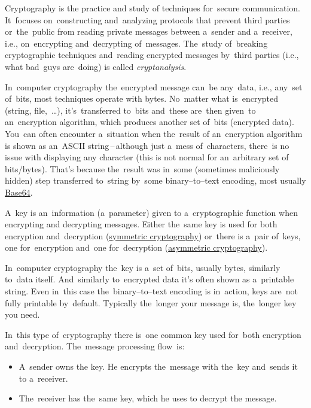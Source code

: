 Cryptography is the practice and study of techniques for~secure communication.
It~focuses on~constructing and~analyzing protocols that prevent third parties or~the~public from reading private messages between a~sender and a~receiver, i.e., on~encrypting and~decrypting of~messages.
The~study of~breaking cryptographic techniques and~reading encrypted messages by~third parties (i.e., what bad~guys are~doing) is called \textit{cryptanalysis}.

In~computer cryptography the~encrypted message can~be any~data, i.e., any~set of~bits, most techniques operate with bytes.
No~matter what is~encrypted (string, file,~\dots), it's~transferred to~bits and~these are~then given~to an~encryption algorithm, which produces another set of~bits (encrypted data).
You~can often encounter a~situation when the~result of an~encryption algorithm is shown as an~ASCII string\,--\,although just a~mess of~characters, there~is no issue with displaying any character (this is not normal for an~arbitrary set of bits/bytes).
That's because the~result was in~some (sometimes maliciously hidden) step transferred to~string by~some binary--to--text encoding, most usually \hyperref[base64]{Base64}.

A~key is an~information (a~parameter) given to a~cryptographic function when encrypting and decrypting messages.
Either the~same key is used for both encryption and~decryption (\hyperref[symmetriccryptography]{symmetric cryptography}) or~there is a~pair of~keys, one for~encryption and~one for~decryption (\hyperref[asymmetriccryptography]{asymmetric cryptography}).

In~computer cryptography the~key is a~set of~bits, usually bytes, similarly to~data itself.
And~similarly to~encrypted data it's often shown as a~printable string.
Even in~this case the~binary--to--text encoding is in~action, keys are~not fully printable by~default.
Typically the~longer your message is, the~longer key you need.

\label{symmetriccryptography}
In~this type of~cryptography there is~one common key used for~both encryption and~decryption.
The~message processing flow~is:
\begin{itemize}
    \item A~sender owns the key.
          He encrypts the~message with the~key and~sends it to a~receiver.
    \item The~receiver has the~same key, which he uses to decrypt the message.
\end{itemize}

